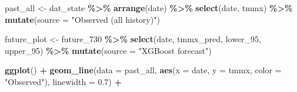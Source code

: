 \documentclass[
]{article}
\newenvironment{Shaded}{\begin{snugshade}}{\end{snugshade}}
\newcommand{\AttributeTok}[1]{\textcolor[rgb]{0.13,0.29,0.53}{#1}}
\newcommand{\FloatTok}[1]{\textcolor[rgb]{0.00,0.00,0.81}{#1}}
\newcommand{\FunctionTok}[1]{\textcolor[rgb]{0.13,0.29,0.53}{\textbf{#1}}}
\newcommand{\NormalTok}[1]{#1}
\newcommand{\OtherTok}[1]{\textcolor[rgb]{0.56,0.35,0.01}{#1}}
\newcommand{\SpecialCharTok}[1]{\textcolor[rgb]{0.81,0.36,0.00}{\textbf{#1}}}
\newcommand{\StringTok}[1]{\textcolor[rgb]{0.31,0.60,0.02}{#1}}
\begin{document}
\begin{Shaded}
\begin{Highlighting}[]
\NormalTok{past\_all }\OtherTok{\textless{}{-}}\NormalTok{ dat\_state }\SpecialCharTok{\%\textgreater{}\%}
  \FunctionTok{arrange}\NormalTok{(date) }\SpecialCharTok{\%\textgreater{}\%}
  \FunctionTok{select}\NormalTok{(date, tmmx) }\SpecialCharTok{\%\textgreater{}\%}
  \FunctionTok{mutate}\NormalTok{(}\AttributeTok{source =} \StringTok{"Observed (all history)"}\NormalTok{)}


\NormalTok{future\_plot }\OtherTok{\textless{}{-}}\NormalTok{ future\_730 }\SpecialCharTok{\%\textgreater{}\%}
  \FunctionTok{select}\NormalTok{(date, tmmx\_pred, lower\_95, upper\_95) }\SpecialCharTok{\%\textgreater{}\%}
  \FunctionTok{mutate}\NormalTok{(}\AttributeTok{source =} \StringTok{"XGBoost forecast"}\NormalTok{)}

\FunctionTok{ggplot}\NormalTok{() }\SpecialCharTok{+}
  \FunctionTok{geom\_line}\NormalTok{(}\AttributeTok{data =}\NormalTok{ past\_all,}
            \FunctionTok{aes}\NormalTok{(}\AttributeTok{x =}\NormalTok{ date, }\AttributeTok{y =}\NormalTok{ tmmx, }\AttributeTok{color =} \StringTok{"Observed"}\NormalTok{),}
            \AttributeTok{linewidth =} \FloatTok{0.7}\NormalTok{) }\SpecialCharTok{+}


\end{Highlighting}
\end{Shaded}
\end{document}
